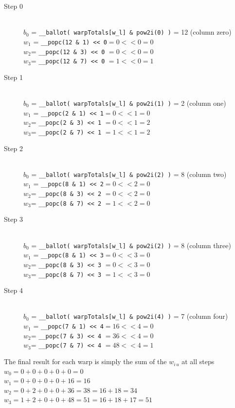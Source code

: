 \begin{description}
\item[Step 0]\hfill \\
	\(b_0\) = \verb|__ballot( warpTotals[w_l] & pow2i(0) )| = 12 (column zero)\\
	\(w_1\) = \verb|__popc(12 & 1) << 0|$ = 0 << 0 = 0$\\
	\(w_2\)= \verb|__popc(12 & 3) << 0| $= 0 << 0  = 0$\\
	\(w_3\)= \verb|__popc(12 & 7) << 0| $= 1 << 0  = 1$\\
	
	\item[Step 1]\hfill \\
	\(b_0\) = \verb|__ballot( warpTotals[w_l] & pow2i(1) )| = 2 (column one)\\
	\(w_1\) = \verb|__popc(2 & 1) << 1|$ = 0 << 1 = 0$\\
	\(w_2\)= \verb|__popc(2 & 3) << 1| $= 0 << 1  = 2$\\
	\(w_3\)= \verb|__popc(2 & 7) << 1| $= 1 << 1  = 2$\\
	
	
	\item[Step 2]\hfill \\
	\(b_0\) = \verb|__ballot( warpTotals[w_l] & pow2i(2) )| = 8 (column two)\\
	\(w_1\) = \verb|__popc(8 & 1) << 2|$ = 0 << 2 = 0$\\
	\(w_2\)= \verb|__popc(8 & 3) << 2| $= 0 << 2 = 0$\\
	\(w_3\)= \verb|__popc(8 & 7) << 2| $= 1 << 2  = 0$\\
	
		\item[Step 3]\hfill \\
	\(b_0\) = \verb|__ballot( warpTotals[w_l] & pow2i(2) )| = 8 (column three)\\
	\(w_1\) = \verb|__popc(8 & 1) << 3|$ = 0 << 3 = 0$\\
	\(w_2\)= \verb|__popc(8 & 3) << 3| $= 0 << 3  = 0$\\
	\(w_3\)= \verb|__popc(8 & 7) << 3| $= 1 << 3  = 0$\\
	
	
	\item[Step 4]\hfill \\
	\(b_0\) = \verb|__ballot( warpTotals[w_l] & pow2i(4) )| = 7 (column four)\\
	\(w_1\) = \verb|__popc(7 & 1) << 4|$ = 16 << 4 =0$\\
	\(w_2\)= \verb|__popc(7 & 3) << 4| $= 36 << 4 =0$\\
	\(w_3\)= \verb|__popc(7 & 7) << 4| $= 48 << 4 =1$\\
	
\end{description}
The final result for each warp is simply the sum of the $w_{i\,u}$ at all steps\\
\(w_0 = 0 + 0 + 0 + 0 + 0 = 0\)\\
\(w_1 = 0 + 0 + 0 + 0 + 16 = 16\)\\
\(w_2 = 0 + 2 + 0 + 0 + 36 = 38 = 16+18=34\)\\
\(w_3 = 1 + 2 + 0 + 0 + 48 = 51 = 16+18+17=51\)\\



